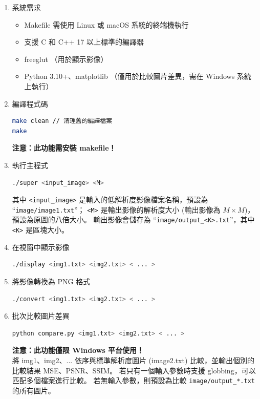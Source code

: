 \documentclass[a4paper,  10pt, oneside, fleqn]{article}
\begin{document}
\begin{enumerate}
    \item 系統需求
          \begin{itemize}
              \item Makefile 需使用 Linux 或 macOS 系統的終端機執行
              \item 支援 C 和 C++ 17 以上標準的編譯器
              \item freeglut （用於顯示影像）
              \item Python 3.10+、matplotlib （僅用於比較圖片差異，需在 Windows 系統上執行）
          \end{itemize}

    \item 編譯程式碼
          \begin{lstlisting}[language=bash]
make clean // 清理舊的編譯檔案
make
\end{lstlisting}
          \textbf{注意：此功能需安裝 makefile！}

    \item 執行主程式
          \begin{lstlisting}[language=bash]
./super <input_image> <M>
\end{lstlisting}
          其中 \lstinline|<input_image>| 是輸入的低解析度影像檔案名稱，預設為 ``\lstinline|image/image1.txt|''；
          \lstinline|<M>| 是輸出影像的解析度大小 (輸出影像為 $M \times M$)，預設為原圖的八倍大小。
          輸出影像會儲存為 ``\lstinline|image/output_<K>.txt|''，其中 \lstinline|<K>| 是區塊大小。

    \item 在視窗中顯示影像
          \begin{lstlisting}[language=bash]
./display <img1.txt> <img2.txt> < ... >
\end{lstlisting}

    \item 將影像轉換為 PNG 格式
          \begin{lstlisting}[language=bash]
./convert <img1.txt> <img2.txt> < ... >
\end{lstlisting}

    \item 批次比較圖片差異
          \begin{lstlisting}[language=bash]
python compare.py <img1.txt> <img2.txt> < ... >
\end{lstlisting}
          \textbf{注意：此功能僅限 Windows 平台使用！} \\
          將 img1、img2、... 依序與標準解析度圖片 (image2.txt) 比較，並輸出個別的比較結果 MSE、PSNR、SSIM。
          若只有一個輸入參數時支援 globbing，可以匹配多個檔案進行比較。
          若無輸入參數，則預設為比較 \lstinline|image/output_*.txt| 的所有圖片。
\end{enumerate}
\end{document}
